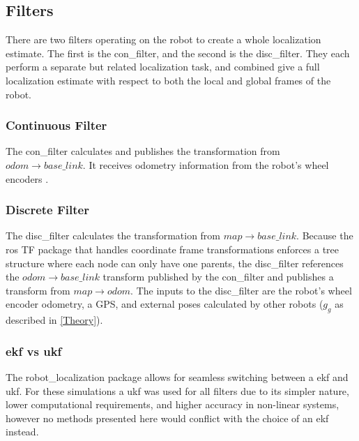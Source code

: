 \documentclass[thesis.tex]{subfile}
\begin{document}
\subsection{Filters}
There are two filters operating on the robot to create a whole localization estimate. The first is the \gls{con_filter}, and the second is the \gls{disc_filter}. They each perform a separate but related localization task, and combined give a full localization estimate with respect to both the local and global frames of the robot. 

\subsubsection{Continuous Filter} \label{con_filter_subsubsection}
The \gls{con_filter} calculates and publishes the transformation from $odom \rightarrow base\_link$. It receives odometry information from the robot's wheel encoders %
.

\subsubsection{Discrete Filter} \label{disc_filter_subsubsection}
The \gls{disc_filter} calculates the transformation from $map \rightarrow base\_link$. Because the \gls{ros} TF package that handles coordinate frame transformations enforces a tree structure where each node can only have one parents, the \gls{disc_filter} references the $odom \rightarrow base\_link$ transform published by the \gls{con_filter} and publishes a transform from $map \rightarrow odom$. The inputs to the \gls{disc_filter} are the robot's wheel encoder odometry, %
a GPS, and external poses calculated by other robots ($g_g$ as described in \autoref{Theory}).

\subsubsection{\gls{ekf} vs \gls{ukf}}
The robot\_localization package allows for seamless switching between a \gls{ekf} and \gls{ukf}. For these simulations a \gls{ukf} was used for all filters due to its simpler nature, lower computational requirements, and higher accuracy in non-linear systems, however no methods presented here would conflict with the choice of an \gls{ekf} instead.
 
\end{document}
